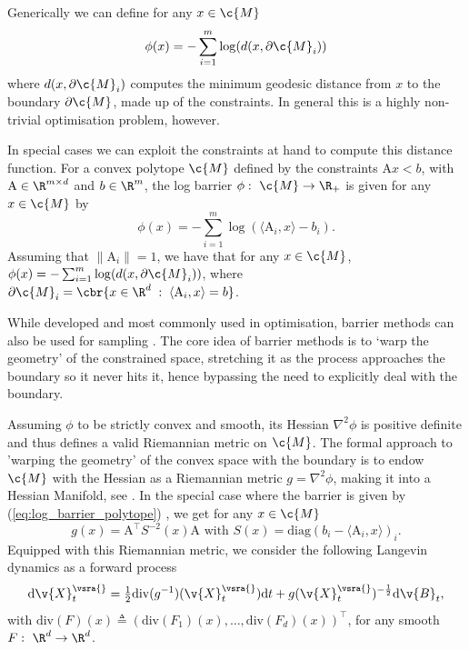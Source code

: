 Generically we can define for any \(x \in \c{M}\) \begin{equation} \label{eq:log_barrier_manifold} { \phi(x) = - \sum_{i=1}^m \log(d(x, \partial \c{M}_i)) } \end{equation} 
where \(d(x, \partial \c{M}_i)\) computes the minimum geodesic distance from \(x\) to the boundary \(\partial \c{M}\), made up of the constraints.
In general this is a highly non-trivial optimisation problem, however.

In special cases we can exploit the constraints at hand to compute this distance function.
For a convex polytope \(\c{M}\) defined by the constraints \(\mathrm{A} x < b\), with \(\mathrm{A} \in \R^{m \times d}\) and \(b \in \R^m\), the log barrier \(\phi: \ \c{M} \to \R_+\) is given for any \(x \in \c{M}\) by \begin{equation} \label{eq:log_barrier_polytope} { \phi(x) = - \sum_{i=1}^m \log(\langle \mathrm{A}_i, x\rangle-b_i).
	}
\end{equation}
Assuming that \(\| \mathrm{A}_i \| =1\), we have that for any \(x \in \c{M}\), \(\phi(x) = - \sum_{i=1}^m \log(d(x, \partial \c{M}_i))\), where \(\partial \c{M}_i = \cbr{x \in \R^d \; : \; \langle \mathrm{A}_i, x\rangle =b}\).

While developed and most commonly used in optimisation, barrier methods can also be used for sampling \parencite{lee2017Geodesic}.
The core idea of barrier methods is to `warp the geometry' of the constrained space, stretching it as the process approaches the boundary so it never hits it, hence bypassing the need to explicitly deal with the boundary.

Assuming \(\phi\) to be strictly convex and smooth, its Hessian \(\nabla^2 \phi\) is positive definite and thus defines a valid Riemannian metric on \(\c{M}\).
The formal approach to 'warping the geometry' of the convex space with the boundary is to endow \(\c{M}\) with the Hessian as a Riemannian metric \(g = \nabla^2 \phi\), making it into a Hessian Manifold, see \cite{shima1997geometry}.
In the special case where the barrier is given by (\ref{eq:log_barrier_polytope}) , we get for any \(x \in \c{M}\) \begin{equation} g(x) = \mathrm{A}^\top S^{-2}(x) \mathrm{A} \text{ with } S(x) = \text{diag}(b_i - \langle \mathrm{A}_i, x \rangle)_i.
\end{equation}
Equipped with this Riemannian metric, we consider the following Langevin dynamics as a forward process \begin{equation} \label{eq:langevin_hessian_manifold} { \mathrm{d} \v{X}_t^\vsra{} = \tfrac{1}{2} \mathrm{div}(g^{-1})( \v{X}_t^\vsra{}) \mathrm{d} t + g( \v{X}_t^\vsra{})^{-\frac{1}{2}} \mathrm{d} \v{B}_t, } \end{equation} with \(\mathrm{div}(F)(x) \triangleq \left(\mathrm{div}(F_1)(x), \dots, \mathrm{div}(F_d)(x) \right)^\top \), for any smooth \(F: \ \R^d \to \R^d\).

